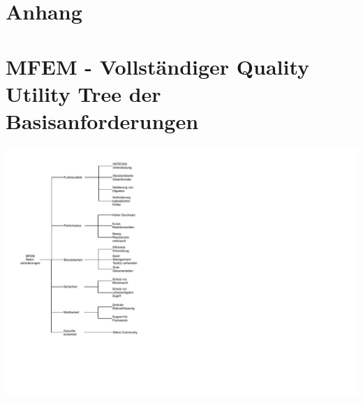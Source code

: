 \documentclass[12pt,a4paper,bibliography=totocnumbered,listof=totocnumbered]{scrartcl}
\numberwithin{figure}{section} %
\begin{document}
\begin{appendix}
\section*{Anhang}
{}
\section{\acs*{MFEM} - Vollständiger Quality Utility Tree der Basisanforderungen}
	\begin{minipage}{\linewidth}
	\centering
	\includegraphics[width=0.8\linewidth]{Bilder/Basisanforderungen-QUT.pdf}	
	\end{minipage}
\pagebreak

\end{appendix}
\end{document}

